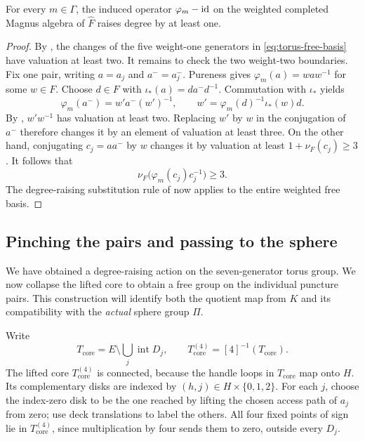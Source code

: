 \begin{proposition}\label{prop:monodromy-raising}
For every $m\in\Gamma$, the induced operator
$\varphi_m-\operatorname{id}$ on the weighted completed Magnus algebra of
$\widehat F$ raises degree by at least one.
\end{proposition}

\begin{proof}
By , the changes of the five weight-one
generators in \eqref{eq:torus-free-basis} have valuation at least
two.  It remains to check the two weight-two boundaries.
Fix one pair, writing $a=a_j$ and $a^-=a_j^-$.
Pureness gives $\varphi_m(a)=waw^{-1}$ for some $w\in F$.
Choose $d\in F$ with $\iota_*(a)=d a^-d^{-1}$.
Commutation with $\iota_*$ yields
\[
 \varphi_m(a^-)=w'a^-(w')^{-1},\qquad
 w'=\varphi_m(d)^{-1}\iota_*(w)d.
\]
By , $w'w^{-1}$ has valuation at least two.
Replacing $w'$ by $w$ in the conjugation of $a^-$ therefore changes
it by an element of valuation at least three.  On the other hand,
conjugating $c_j=aa^-$ by $w$ changes it by valuation at least
$1+\nu_F(c_j)\ge3$.  It follows that
\[
 \nu_F\bigl(\varphi_m(c_j)c_j^{-1}\bigr)\ge3.
\]
The degree-raising substitution rule of 
now applies to the entire weighted free basis.
\end{proof}

\subsection{Pinching the pairs and passing to the sphere}

We have obtained a degree-raising action on the seven-generator
torus group. We now collapse the lifted core to obtain a free group
on the individual puncture pairs. This construction will identify
both the quotient map from $K$ and its compatibility with the
\emph{actual} sphere group $\Pi$.

Write
\[
 T_{\mathrm{core}}=E\setminus\bigcup_j\operatorname{int}D_j,
 \qquad T_{\mathrm{core}}^{(4)}=[4]^{-1}(T_{\mathrm{core}}).
\]
The lifted core $T_{\mathrm{core}}^{(4)}$ is connected, because the
handle loops in $T_{\mathrm{core}}$ map onto $H$. Its complementary disks are indexed by
$(h,j)\in H\times\{0,1,2\}$. For each $j$, choose the index-zero
disk to be the one reached by lifting the chosen access path of
$a_j$ from zero; use deck translations to label the others.
All four fixed points of sign lie in $T_{\mathrm{core}}^{(4)}$, since multiplication
by four sends them to zero, outside every $D_j$.

